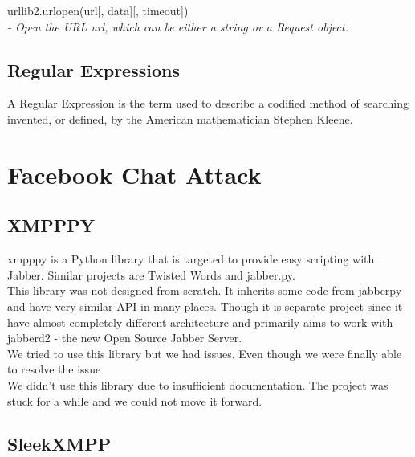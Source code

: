 urllib2.urlopen(url[, data][, timeout])\\[0.5cm]

\emph{ - Open the URL url, which can be either a string or a Request object.}

\subsection{Regular Expressions}
A Regular Expression is the term used to describe a codified method of searching invented, or defined, by the American mathematician Stephen Kleene.\cite{whatisregex}


\section{Facebook Chat Attack}
\subsection{XMPPPY}
xmpppy is a Python library that is targeted to provide easy scripting with Jabber. Similar projects are Twisted Words and jabber.py.\\[0.5cm]
This library was not designed from scratch. It inherits some code from jabberpy and have very similar API in many places. Though it is separate project since it have almost completely different architecture and primarily aims to work with jabberd2 - the new Open Source Jabber Server.\\
We tried to use this library but we had issues\cite{xmpppy_issue1}\cite{xmpppy_issue2}. Even though we were finally able to resolve the issue\cite{xmpppy_issue3}\\[0.5cm]
We didn't use this library due to insufficient documentation. The project was stuck for a while and we could not move it forward.

\subsection{SleekXMPP}

